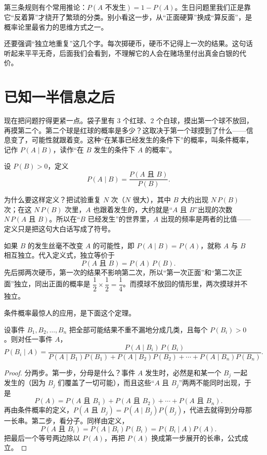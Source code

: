 第三条规则有个常用推论：$P(A\text{ 不发生})=1-P(A)$。生日问题里我们正是靠它“反着算”才绕开了繁琐的分类。别小看这一步，从“正面硬算”换成“算反面”，是概率论里最省力的思维方式之一。

还要强调“独立地重复”这几个字。每次掷硬币，硬币不记得上一次的结果。这句话听起来平平无奇，后面我们会看到，不理解它的人会在赌场里付出真金白银的代价。

\section{已知一半信息之后}

现在把问题拧得更紧一点。袋子里有 $3$ 个红球、$2$ 个白球，摸出第一个球不放回，再摸第二个。第二个球是红球的概率是多少？这取决于第一个球摸到了什么——信息变了，可能性就跟着变。这种“在某事已经发生的条件下”的概率，叫条件概率，记作 $P(A\mid B)$，读作“在 $B$ 发生的条件下 $A$ 的概率”。

\begin{dingyi}
设 $P(B)>0$，定义
\[
P(A\mid B)=\frac{P(A\text{ 且 }B)}{P(B)}.
\]
\end{dingyi}

为什么要这样定义？把试验重复 $N$ 次（$N$ 很大），其中 $B$ 大约出现 $N\,P(B)$ 次；在这 $N\,P(B)$ 次里，$A$ 也跟着发生的，大约就是“$A$ 且 $B$”出现的次数 $N\,P(A\text{ 且 }B)$。所以在“$B$ 已经发生”的世界里，$A$ 出现的频率是两者的比值——定义只是把这句大白话写成了符号。

如果 $B$ 的发生丝毫不改变 $A$ 的可能性，即 $P(A\mid B)=P(A)$，就称 $A$ 与 $B$ 相互独立。代入定义式，独立等价于
\[
P(A\text{ 且 }B)=P(A)\,P(B).
\]
先后掷两次硬币，第一次的结果不影响第二次，所以“第一次正面”和“第二次正面”独立，同出正面的概率是 $\dfrac{1}{2}\times\dfrac{1}{2}=\dfrac{1}{4}$。而摸球不放回的情形里，两次摸球并不独立。

条件概率最惊人的应用，是下面这个定理。

\begin{dingli}[贝叶斯公式]
设事件 $B_1,B_2,\dots,B_n$ 把全部可能结果不重不漏地分成几类，且每个 $P(B_i)>0$。则对任一事件 $A$，
\[
P(B_i\mid A)=\frac{P(A\mid B_i)\,P(B_i)}{P(A\mid B_1)P(B_1)+P(A\mid B_2)P(B_2)+\cdots+P(A\mid B_n)P(B_n)}.
\]
\end{dingli}

\begin{proof}
分两步。第一步，分母是什么？事件 $A$ 发生时，必然是和某一个 $B_j$ 一起发生的（因为 $B_j$ 们覆盖了一切可能），而且这些“$A$ 且 $B_j$”两两不能同时出现，于是
\[
P(A)=P(A\text{ 且 }B_1)+P(A\text{ 且 }B_2)+\cdots+P(A\text{ 且 }B_n).
\]
再由条件概率的定义，$P(A\text{ 且 }B_j)=P(A\mid B_j)P(B_j)$，代进去就得到分母那一长串。第二步，看分子。同样由定义，
\[
P(A\text{ 且 }B_i)=P(A\mid B_i)P(B_i)=P(B_i\mid A)P(A).
\]
把最后一个等号两边除以 $P(A)$，再把 $P(A)$ 换成第一步展开的长串，公式成立。
\end{proof}

